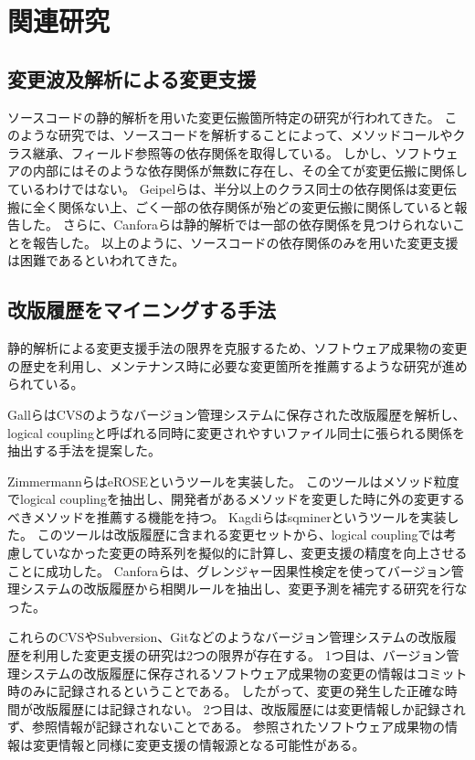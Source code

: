 \documentclass[a4paper]{jsbook}
\begin{document}
\chapter{関連研究}\label{related_chap}
\section{変更波及解析による変更支援}
ソースコードの静的解析を用いた変更伝搬箇所特定の研究が行われてきた\cite{792645}。
このような研究では、ソースコードを解析することによって、メソッドコールやクラス継承、フィールド参照等の依存関係を取得している。
しかし、ソフトウェアの内部にはそのような依存関係が無数に存在し、その全てが変更伝搬に関係しているわけではない。
Geipelら\cite{Geipel:2009}は、半分以上のクラス同士の依存関係は変更伝搬に全く関係ない上、ごく一部の依存関係が殆どの変更伝搬に関係していると報告した。
さらに、Canforaら\cite{5609732}は静的解析では一部の依存関係を見つけられないことを報告した。
以上のように、ソースコードの依存関係のみを用いた変更支援は困難であるといわれてきた。

\section{改版履歴をマイニングする手法}
静的解析による変更支援手法の限界を克服するため、ソフトウェア成果物の変更の歴史を利用し、メンテナンス時に必要な変更箇所を推薦するような研究が進められている。

Gallら\cite{738508}はCVSのようなバージョン管理システムに保存された改版履歴を解析し、logical couplingと呼ばれる同時に変更されやすいファイル同士に張られる関係を抽出する手法を提案した。

ZimmermannらはeROSEというツール\cite{Zimmermann:2005}を実装した。
このツールはメソッド粒度でlogical couplingを抽出し、開発者があるメソッドを変更した時に外の変更するべきメソッドを推薦する機能を持つ。
Kagdiらはsqminerというツール\cite{Kagdi:2006}を実装した。
このツールは改版履歴に含まれる変更セットから、logical couplingでは考慮していなかった変更の時系列を擬似的に計算し、変更支援の精度を向上させることに成功した。
Canforaら\cite{5609732}は、グレンジャー因果性検定を使ってバージョン管理システムの改版履歴から相関ルールを抽出し、変更予測を補完する研究を行なった。

これらのCVSやSubversion、Gitなどのようなバージョン管理システムの改版履歴を利用した変更支援の研究は2つの限界が存在する。
1つ目は、バージョン管理システムの改版履歴に保存されるソフトウェア成果物の変更の情報はコミット時のみに記録されるということである。
したがって、変更の発生した正確な時間が改版履歴には記録されない。
2つ目は、改版履歴には変更情報しか記録されず、参照情報が記録されないことである。
参照されたソフトウェア成果物の情報は変更情報と同様に変更支援の情報源となる可能性がある。
\end{document}

